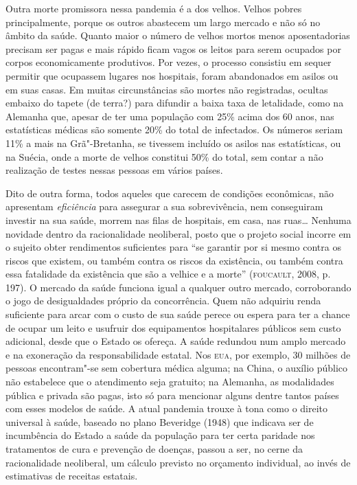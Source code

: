 Outra morte promissora nessa pandemia é a dos velhos. Velhos pobres
principalmente, porque os outros abastecem um largo mercado e não só no
âmbito da saúde. Quanto maior o número de velhos mortos menos
aposentadorias precisam ser pagas e mais rápido ficam vagos os leitos
para serem ocupados por corpos economicamente produtivos. Por vezes, o
processo consistiu em sequer permitir que ocupassem lugares nos
hospitais, foram abandonados em asilos ou em suas casas. Em muitas
circunstâncias são mortes não registradas, ocultas embaixo do tapete (de
terra?) para difundir a baixa taxa de letalidade, como na Alemanha que,
apesar de ter uma população com 25\% acima dos 60 anos, nas estatísticas
médicas são somente 20\% do total de infectados. Os números seriam 11\%
a mais na Grã"-Bretanha, se tivessem incluído os asilos nas estatísticas,
ou na Suécia, onde a morte de velhos constitui 50\% do total, sem contar
a não realização de testes nessas pessoas em vários países.

Dito de outra forma, todos aqueles
que carecem de condições econômicas, não apresentam \emph{eficiência}
para assegurar a sua sobrevivência, nem conseguiram investir na sua
saúde, morrem nas filas de hospitais, em casa, nas ruas\ldots{} Nenhuma
novidade dentro da racionalidade neoliberal, posto que o projeto social
incorre em o sujeito obter rendimentos suficientes para
``se garantir por si mesmo contra
os riscos que existem, ou também contra os riscos da existência, ou
também contra essa fatalidade da existência que são a velhice e a
morte'' (\textsc{foucault}, 2008, p. 197). O mercado da saúde funciona igual a
qualquer outro mercado, corroborando o jogo de desigualdades próprio da
concorrência. Quem não adquiriu renda suficiente para arcar com o custo
de sua saúde perece ou espera para ter a chance de ocupar um leito e
usufruir dos equipamentos hospitalares públicos sem custo adicional,
desde que o Estado os ofereça. A saúde redundou num amplo mercado e na
exoneração da responsabilidade estatal. Nos \textsc{eua}, por exemplo, 30 milhões
de pessoas encontram"-se sem cobertura médica alguma; na China, o auxílio
público não estabelece que o atendimento seja gratuito; na Alemanha, as
modalidades pública e privada são pagas, isto só para mencionar alguns
dentre tantos países com esses modelos de saúde. A atual pandemia trouxe
à tona como o direito universal à saúde, baseado no plano Beveridge
(1948) que indicava ser de incumbência do Estado a saúde da população
para ter certa paridade nos tratamentos de cura e prevenção de doenças,
passou a ser, no cerne da racionalidade neoliberal, um cálculo previsto
no orçamento individual, ao invés de estimativas de receitas estatais.

